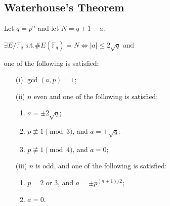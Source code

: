 \documentclass{beamer}%
\newcommand{\F}{\mathbb F}
\theoremstyle{definition}
\begin{document}
\subsection{Waterhouse's Theorem}
\begin{frame}[label=current]
\begin{theorem}[Waterhouse]\pause
\label{lem:Water}
 Let $q=p^n$ and let $N = q + 1-a$.\\
\centerline{$\exists E/\F_q\text{ s.t.}\#E(\F_q) = N\Leftrightarrow|a|\le 2\sqrt q\text{ and}$}
 one of the following is satisfied:\pause
\begin{itemize}[<+-| alert@+>]
\item[(i)] $\gcd(a, p) = 1$;
\item[(ii)] $n$ even and one of the following is satisfied:
\begin{enumerate}
  \item $a=\pm 2\sqrt q$;
  \item $p\not\equiv 1 \pmod 3$, and $a = \pm\sqrt q$;
  \item $p\not\equiv 1 \pmod 4$, and $a = 0$;
\end{enumerate}
\item[(iii)] $n$ is odd, and one of the following is satisfied:
 \begin{enumerate}
   \item $p = 2$ or $3$, and $a = \pm p^{(n+1)/2}$;
   \item $a = 0$.
 \end{enumerate}
 \end{itemize}
\end{theorem}\pause


\end{frame}
\end{document}
